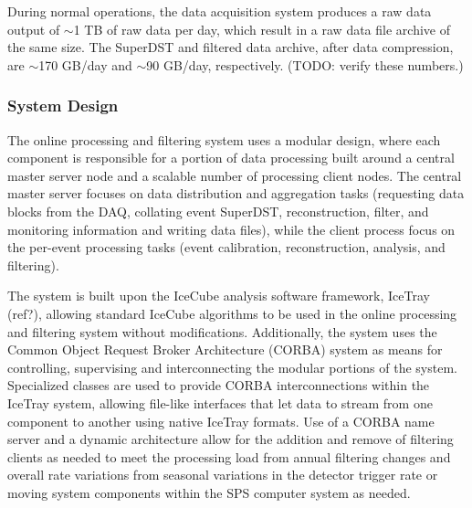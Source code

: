 During normal operations, the data acquisition system produces a raw data output of $\sim$1 TB of raw data per day, which result in
a raw data file archive of the same size.  The SuperDST  and filtered data archive, after data compression, are $\sim$170 GB/day and $\sim$90 GB/day,
respectively.  (TODO: verify these numbers.)
\subsubsection{System Design}

The online processing and filtering system uses a modular design, where each component
is responsible for a portion of data processing built around a central master server node and a
scalable number of processing client nodes.  The central master server focuses on
data distribution and aggregation tasks (requesting data blocks from the DAQ, collating event SuperDST, reconstruction, filter,
and monitoring information and writing data files), while the client process focus on the per-event
processing tasks (event calibration, reconstruction, analysis, and filtering).  

The system is built upon the IceCube analysis software framework, IceTray (ref?), allowing standard IceCube algorithms to
be used in the online processing and filtering system without modifications.  Additionally, the system uses the 
Common Object Request Broker Architecture (CORBA) system as means for controlling, supervising and interconnecting
the modular portions of the system.  Specialized classes are used to provide CORBA interconnections
within the IceTray system, allowing file-like interfaces that let data to stream from one component to another 
using native IceTray formats.  Use of a CORBA name server and a dynamic architecture allow for the
addition and remove of filtering clients as needed to meet the processing load from annual filtering
changes and overall rate variations from seasonal variations in the detector trigger rate or moving system components within the SPS
computer system as needed.


